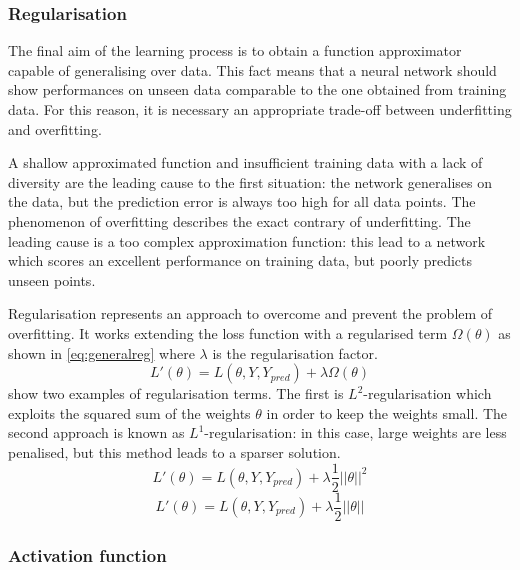 \subsubsection{Regularisation}

The final aim of the learning process is to obtain a function approximator capable of generalising over data.
This fact means that a neural network should show performances on unseen data comparable to the one obtained from training data.
For this reason, it is necessary an appropriate trade-off between underfitting and overfitting.

A shallow approximated function and insufficient training data with a lack of diversity are the leading cause to the first situation: the network generalises on the data, but the prediction error is always too high for all data points.
The phenomenon of overfitting describes the exact contrary of underfitting.
The leading cause is a too complex approximation function: this lead to a network which scores an excellent performance on training data, but poorly predicts unseen points.

Regularisation \cite{bishop2006pattern,lecun2015deep} represents an approach to overcome and prevent the problem of overfitting.
It works extending the loss function with a regularised term $\Omega(\theta)$ as shown in \vref{eq:generalreg} where $\lambda$ is the regularisation factor.
\begin{equation}\label{eq:generalreg}
	L'(\theta) = L(\theta, Y, Y_{pred}) + \lambda \Omega(\theta)
\end{equation}
 show two examples of regularisation terms.
The first is $L^2$-regularisation which exploits the squared sum of the weights $\theta$ in order to keep the weights small.
The second approach is known as $L^1$-regularisation: in this case, large weights are less penalised, but this method leads to a sparser solution.
\begin{equation}\label{eq:l2reg}
	L'(\theta) = L(\theta, Y, Y_{pred}) + \lambda \frac{1}{2}||\theta||^2
\end{equation}
\begin{equation}\label{eq:l1reg}
	L'(\theta) = L(\theta, Y, Y_{pred}) + \lambda \frac{1}{2}||\theta||
\end{equation}


\subsubsection{Activation function}

